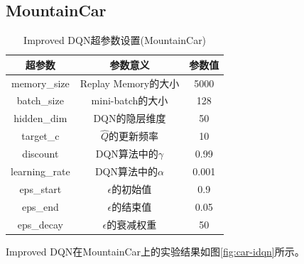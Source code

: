 \documentclass[a4paper,UTF8]{article}
\theoremstyle{definition}
\begin{document}
\subsection*{MountainCar}

\begin{table}[H]
	\centering
	\begin{tabular}{ccc}
		\toprule
		超参数 & 参数意义 & 参数值 \\
		\midrule
		memory\_size & Replay Memory的大小 & 5000 \\
		batch\_size & mini-batch的大小 & 128 \\
		hidden\_dim & DQN的隐层维度 & 50 \\
		target\_c & $\hat{Q}$的更新频率 & 10 \\
		discount & DQN算法中的$\gamma$ & 0.99 \\
		learning\_rate & DQN算法中的$\alpha$ & 0.001 \\
		eps\_start & $\epsilon$的初始值 & 0.9 \\
		eps\_end & $\epsilon$的结束值 & 0.05 \\
		eps\_decay & $\epsilon$的衰减权重 & 50 \\
		\bottomrule
	\end{tabular}
	\caption{Improved DQN超参数设置(MountainCar)}\label{tab:car-idqn}
\end{table}

Improved DQN在MountainCar上的实验结果如图\ref{fig:car-idqn}所示。
\end{document}
